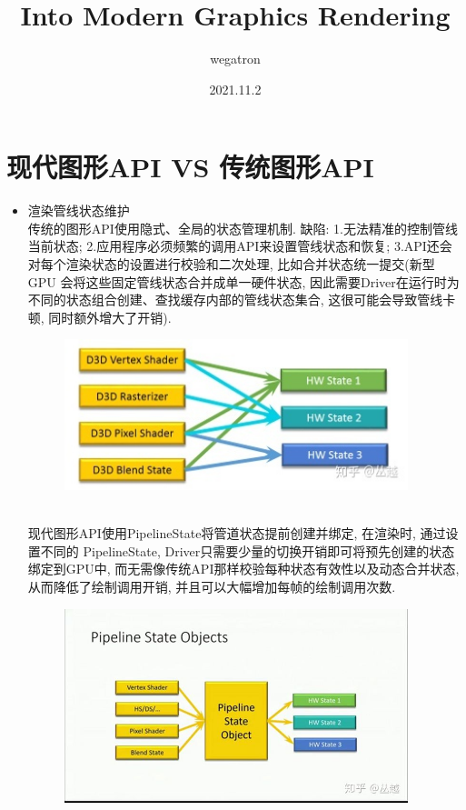 \documentclass[UTF8]{ctexart}
\title{Into Modern Graphics Rendering}
\author{wegatron}
\date{2021.11.2}
\begin{document}
\maketitle

\section{现代图形API VS 传统图形API}

\begin{itemize}
\item 渲染管线状态维护
  \\传统的图形API使用隐式、全局的状态管理机制. 缺陷: 1.无法精准的控制管线当前状态; 2.应用程序必须频繁的调用API来设置管线状态和恢复; 3.API还会对每个渲染状态的设置进行校验和二次处理, 比如合并状态统一提交(新型 GPU 会将这些固定管线状态合并成单一硬件状态, 因此需要Driver在运行时为不同的状态组合创建、查找缓存内部的管线状态集合, 这很可能会导致管线卡顿, 同时额外增大了开销).
  \begin{figure}[h]
    \includegraphics[width=10cm]{render_state_merge.jpg}
    \centering
  \end{figure}
  \\现代图形API使用PipelineState将管道状态提前创建并绑定, 在渲染时, 通过设置不同的 PipelineState, Driver只需要少量的切换开销即可将预先创建的状态绑定到GPU中, 而无需像传统API那样校验每种状态有效性以及动态合并状态, 从而降低了绘制调用开销, 并且可以大幅增加每帧的绘制调用次数.
  \begin{figure}[h]
    \includegraphics[width=10cm]{pipline_state_object.jpg}

\end{figure}
\end{itemize}
\end{document}
